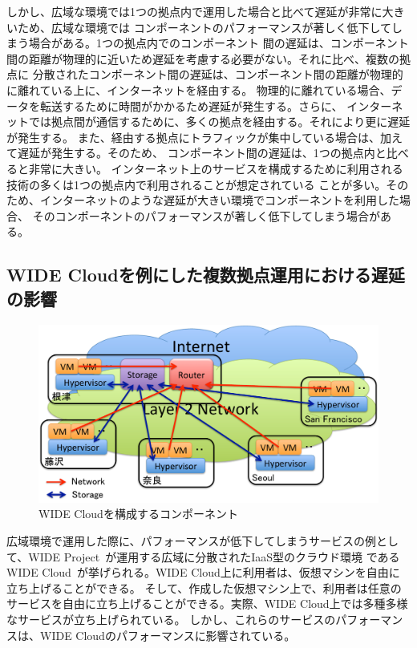 しかし、広域な環境では1つの拠点内で運用した場合と比べて遅延が非常に大きいため、広域な環境では
コンポーネントのパフォーマンスが著しく低下してしまう場合がある。1つの拠点内でのコンポーネント
間の遅延は、コンポーネント間の距離が物理的に近いため遅延を考慮する必要がない。それに比べ、複数の拠点に
分散されたコンポーネント間の遅延は、コンポーネント間の距離が物理的に離れている上に、インターネットを経由する。
物理的に離れている場合、データを転送するために時間がかかるため遅延が発生する。さらに、
インターネットでは拠点間が通信するために、多くの拠点を経由する。それにより更に遅延が発生する。
また、経由する拠点にトラフィックが集中している場合は、加えて遅延が発生する。そのため、
コンポーネント間の遅延は、1つの拠点内と比べると非常に大きい。
インターネット上のサービスを構成するために利用される技術の多くは1つの拠点内で利用されることが想定されている
ことが多い。そのため、インターネットのような遅延が大きい環境でコンポーネントを利用した場合、
そのコンポーネントのパフォーマンスが著しく低下してしまう場合がある。

\subsection{WIDE Cloudを例にした複数拠点運用における遅延の影響}
\label{wcclatency}

\begin{figure}
	\begin{center}
		\includegraphics[scale=0.60]{./img/widecloud}
		\caption{WIDE Cloudを構成するコンポーネント}
		\label{img:widecloud}
	\end{center}
\end{figure}

広域環境で運用した際に、パフォーマンスが低下してしまうサービスの例として、WIDE Project~\cite{wideproject}が運用する広域に分散されたIaaS型のクラウド環境
であるWIDE Cloud~\cite{wcc}が挙げられる。WIDE Cloud上に利用者は、仮想マシンを自由に立ち上げることができる。
そして、作成した仮想マシン上で、利用者は任意のサービスを自由に立ち上げることができる。実際、WIDE Cloud上では多種多様なサービスが立ち上げられている。
しかし、これらのサービスのパフォーマンスは、WIDE Cloudのパフォーマンスに影響されている。

